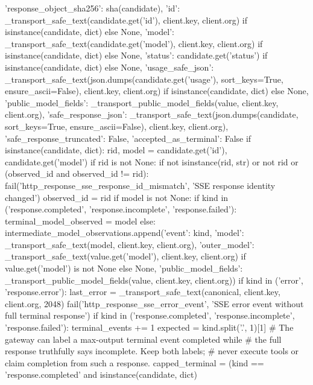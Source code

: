 {{                'response_object_sha256': sha(candidate),
                'id': _transport_safe_text(candidate.get('id'), client.key, client.org) if isinstance(candidate, dict) else None,
                'model': _transport_safe_text(candidate.get('model'), client.key, client.org) if isinstance(candidate, dict) else None,
                'status': candidate.get('status') if isinstance(candidate, dict) else None,
                'usage_safe_json': _transport_safe_text(json.dumps(candidate.get('usage'), sort_keys=True, ensure_ascii=False), client.key, client.org) if isinstance(candidate, dict) else None,
                'public_model_fields': _transport_public_model_fields(value, client.key, client.org),
                'safe_response_json': _transport_safe_text(json.dumps(candidate, sort_keys=True, ensure_ascii=False), client.key, client.org),
                'safe_response_truncated': False, 'accepted_as_terminal': False}
        if isinstance(candidate, dict):
            rid, model = candidate.get('id'), candidate.get('model')
            if rid is not None:
                if not isinstance(rid, str) or not rid or (observed_id and observed_id != rid):
                    fail('http_response_sse_response_id_mismatch', 'SSE response identity changed')
                observed_id = rid
            if model is not None:
                if kind in ('response.completed', 'response.incomplete', 'response.failed'):
                    terminal_model_observed = model
                else:
                    intermediate_model_observations.append({'event': kind,
                        'model': _transport_safe_text(model, client.key, client.org),
                        'outer_model': _transport_safe_text(value.get('model'), client.key, client.org) if value.get('model') is not None else None,
                        'public_model_fields': _transport_public_model_fields(value, client.key, client.org)})
        if kind in ('error', 'response.error'):
            last_error = _transport_safe_text(canonical, client.key, client.org, 2048)
            fail('http_response_sse_error_event', 'SSE error event without full terminal response')
        if kind in ('response.completed', 'response.incomplete', 'response.failed'):
            terminal_events += 1
            expected = kind.split('.', 1)[1]
            # The gateway can label a max-output terminal event completed while
            # the full response truthfully says incomplete. Keep both labels;
            # never execute tools or claim completion from such a response.
            capped_terminal = (kind == 'response.completed' and isinstance(candidate, dict)
}
